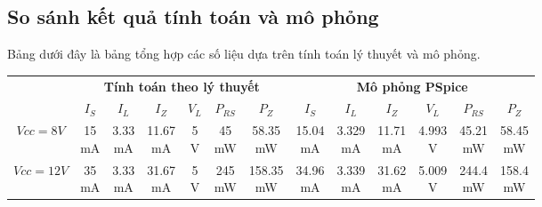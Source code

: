 \subsection{So sánh kết quả tính toán và mô phỏng}
Bảng dưới đây là bảng tổng hợp các số liệu dựa trên tính toán lý thuyết và mô phỏng.
\begin{table}[H]
    \centering
    \begin{tabular}{|c|c|c|c|c|c|c|c|c|c|c|c|c|}
        \cline{2-13}
        \multicolumn{1}{c|}{} & \multicolumn{6}{c|}{\textbf{Tính toán theo lý thuyết}} & \multicolumn{6}{c|}{\textbf{Mô phỏng PSpice}} \\ \cline{2-13}
        \multicolumn{1}{c|}{} & $I_{S}$ & $I_{L}$ & $I_{Z}$ &$V_{L}$ &$P_{RS}$ & $P_{Z}$ & $I_{S}$ & $I_{L}$ & $I_{Z}$ &$V_{L}$ & $P_{RS}$ & $P_{Z}$ \\ \hline
        $Vcc = 8V$ & \makecell{ 15\\ mA} & \makecell{ 3.33\\ mA} & \makecell{ 11.67\\ mA} & \makecell{ 5\\ V} & \makecell{ 45\\ mW} & \makecell{ 58.35\\ mW} & \makecell{15.04 \\ mA} & \makecell{3.329 \\ mA} & \makecell{11.71 \\ mA} & \makecell{4.993 \\ V} & \makecell{45.21 \\ mW} & \makecell{58.45 \\ mW} \\ \hline
        $Vcc = 12V$ & \makecell{ 35\\ mA} & \makecell{ 3.33\\ mA} & \makecell{ 31.67\\ mA} & \makecell{ 5\\ V} & \makecell{ 245\\ mW} & \makecell{ 158.35\\ mW} & \makecell{34.96\\ mA} & \makecell{3.339\\ mA} & \makecell{31.62\\ mA} & \makecell{ 5.009\\ V} & \makecell{244.4 \\ mW} & \makecell{ 158.4\\ mW} \\ \hline
    \end{tabular}
\end{table}